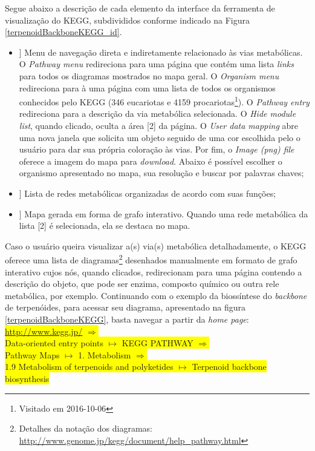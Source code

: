 \indent Segue abaixo a descrição de cada elemento da interface da ferramenta de visualização do KEGG, subdivididos conforme indicado na Figura \ref{terpenoidBackboneKEGG_id}.

\begin{itemize}
\item[[ 1]] Menu de navegação direta e indiretamente relacionado às vias metabólicas. O \textit{Pathway menu} redireciona para uma página que contém uma lista \textit{links} para todos os diagramas mostrados no mapa geral. O \textit{Organism menu} redireciona para à uma página com uma lista de todos os organismos conhecidos pelo KEGG (346 eucariotas e 4159 procariotas\footnote{Visitado em 2016-10-06}). O \textit{Pathway entry} redireciona para a descrição da via metabólica selecionada. O \textit{Hide module list}, quando clicado, oculta a área [2] da página. O \textit{User data mapping} abre uma nova janela que solicita um objeto seguido de uma cor escolhida pelo o usuário para dar sua própria coloração às vias. Por fim, o \textit{Image (png) file} oferece a imagem do mapa para \textit{download}. Abaixo é possível escolher o organismo apresentado no mapa, sua resolução e buscar por palavras chaves;
\item[[ 2]] Lista de redes metabólicas organizadas de acordo com suas funções;
\item[[ 3]] Mapa gerada em forma de grafo interativo. Quando uma rede metabólica da lista [2] é selecionada, ela se destaca no mapa.
\end{itemize}

\indent Caso o usuário queira visualizar a(s) via(s) metabólica detalhadamente, o KEGG oferece uma lista de diagramas\footnote{Detalhes da notação dos diagramas: \url{http://www.genome.jp/kegg/document/help_pathway.html}} desenhados manualmente em formato de grafo interativo cujos nós, quando clicados, redirecionam para uma página contendo a descrição do objeto, que pode ser enzima, composto químico ou outra rele metabólica, por exemplo. Continuando com o exemplo da biossíntese do \textit{backbone} de terpenóides, para acessar seu diagrama, apresentado na figura \ref{terpenoidBackboneKEGG}, basta navegar a partir da \textit{home page}: \\

\indent \colorbox{yellow}{\url{http://www.kegg.jp/} $\Rightarrow$} \\
\indent \colorbox{yellow}{Data-oriented entry points  $\mapsto$ KEGG PATHWAY $\Rightarrow$} \\
\indent \colorbox{yellow}{Pathway Maps $\mapsto$ 1. Metabolism  $\Rightarrow$} \\
\indent \colorbox{yellow}{1.9 Metabolism of terpenoids and polyketides  $\mapsto$ Terpenoid backbone biosynthesis} \\


